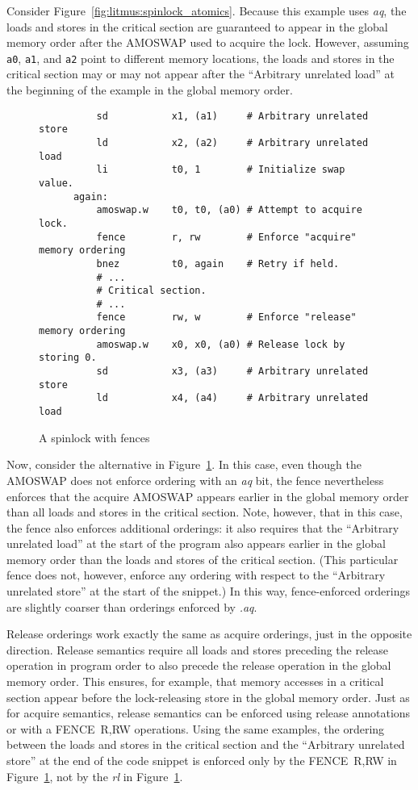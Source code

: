 Consider Figure~\ref{fig:litmus:spinlock_atomics}.
Because this example uses {\em aq}, the loads and stores in the critical section are guaranteed to appear in the global memory order after the AMOSWAP used to acquire the lock.  However, assuming {\tt a0}, {\tt a1}, and {\tt a2} point to different memory locations, the loads and stores in the critical section may or may not appear after the ``Arbitrary unrelated load'' at the beginning of the example in the global memory order.

\begin{figure}[h!]
  \centering\small
  \begin{verbatim}
          sd           x1, (a1)     # Arbitrary unrelated store
          ld           x2, (a2)     # Arbitrary unrelated load
          li           t0, 1        # Initialize swap value.
      again:
          amoswap.w    t0, t0, (a0) # Attempt to acquire lock.
          fence        r, rw        # Enforce "acquire" memory ordering
          bnez         t0, again    # Retry if held.
          # ...
          # Critical section.
          # ...
          fence        rw, w        # Enforce "release" memory ordering
          amoswap.w    x0, x0, (a0) # Release lock by storing 0.
          sd           x3, (a3)     # Arbitrary unrelated store
          ld           x4, (a4)     # Arbitrary unrelated load
  \end{verbatim}
  \caption{A spinlock with fences}
  \label{fig:litmus:spinlock_fences}
\end{figure}

Now, consider the alternative in Figure~\ref{fig:litmus:spinlock_fences}.
In this case, even though the AMOSWAP does not enforce ordering with an {\em aq} bit, the fence nevertheless enforces that the acquire AMOSWAP appears earlier in the global memory order than all loads and stores in the critical section.
Note, however, that in this case, the fence also enforces additional orderings: it also requires that the ``Arbitrary unrelated load'' at the start of the program also appears earlier in the global memory order than the loads and stores of the critical section.  (This particular fence does not, however, enforce any ordering with respect to the ``Arbitrary unrelated store'' at the start of the snippet.)
In this way, fence-enforced orderings are slightly coarser than orderings enforced by {\em .aq}.

Release orderings work exactly the same as acquire orderings, just in the opposite direction.  Release semantics require all loads and stores preceding the release operation in program order to also precede the release operation in the global memory order.
This ensures, for example, that memory accesses in a critical section appear before the lock-releasing store in the global memory order.  Just as for acquire semantics, release semantics can be enforced using release annotations or with a FENCE~R,RW operations.  Using the same examples, the ordering between the loads and stores in the critical section and the ``Arbitrary unrelated store'' at the end of the code snippet is enforced only by the FENCE~R,RW in Figure~\ref{fig:litmus:spinlock_fences}, not by the {\em rl} in Figure~\ref{fig:litmus:spinlock_fences}.

